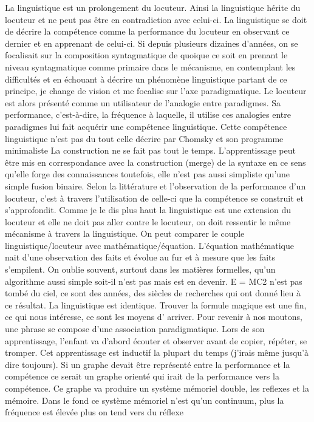 \documentclass[a4paper,11pt]{article}
\begin{document}
La linguistique est un prolongement du locuteur. Ainsi la linguistique hérite du locuteur et ne peut pas être en contradiction avec celui-ci.
La linguistique se doit de décrire la compétence comme la performance du locuteur en observant ce dernier et en apprenant de celui-ci.
Si depuis plusieurs dizaines d'années, on se focalisait sur la composition syntagmatique de quoique ce soit en prenant le niveau syntagmatique comme primaire
dans le mécanisme, en contemplant les difficultés et en échouant à décrire un phénomène linguistique partant de ce principe, je change de vision et me focalise sur l'axe paradigmatique.
Le locuteur est alors présenté comme un utilisateur de l'analogie entre paradigmes. Sa performance, c'est-à-dire, la fréquence à laquelle, il utilise
ces analogies entre paradigmes lui fait acquérir une compétence linguistique. Cette compétence linguistique n'est pas du tout celle décrire par Chomsky et son programme minimaliste
La construction ne se fait pas tout le temps. L'apprentissage peut être mis en correspondance avec la construction (merge) de la syntaxe en ce sens qu'elle forge des connaissances
toutefois, elle n'est pas aussi simpliste qu'une simple fusion binaire. Selon la littérature et l'observation de la performance d'un locuteur, c'est à travers l'utilisation de celle-ci que la compétence se construit et
s'approfondit. Comme je le dis plus haut la linguistique est une extension du locuteur et elle ne doit pas aller contre le locuteur, on doit ressentir le même mécanisme à travers
la linguistique. 
On peut comparer le couple linguistique/locuteur avec mathématique/équation. L'équation mathématique nait d'une observation des faits et évolue au fur et à mesure que les faits s'empilent. 
On oublie souvent, surtout dans les matières formelles, qu'un algorithme aussi simple soit-il n'est pas mais est en devenir. E = MC2 n'est pas tombé du ciel, ce sont des années, des siècles de recherches
qui ont donné lieu à ce résultat. La linguistique est identique. Trouver la formule magique est une fin, ce qui nous intéresse, ce sont les moyens d' arriver.
Pour revenir à nos moutons, une phrase se compose d'une association paradigmatique. Lors de son apprentissage, l'enfant va d'abord écouter et observer avant de copier, répéter, se tromper.
Cet apprentissage est inductif la plupart du temps (j'irais même jusqu'à dire toujours). Si un graphe devait être représenté entre la performance et la compétence ce serait un graphe orienté qui irait
de la performance vers la compétence. Ce graphe va produire un système mémoriel double, les reflexes et la mémoire. Dans le fond ce système mémoriel n'est qu'un continuum, plus la fréquence est élevée plus on tend vers du réflexe
\end{document}
